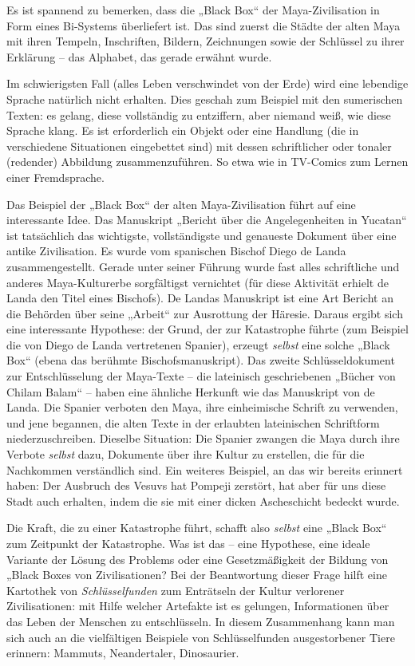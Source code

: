 \documentclass[11pt,a4paper]{article}
\begin{document}
Es ist spannend zu bemerken, dass die „Black Box“ der Maya-Zivilisation in
Form eines Bi-Systems überliefert ist.  Das sind zuerst die Städte der alten
Maya mit ihren Tempeln, Inschriften, Bildern, Zeichnungen sowie der Schlüssel
zu ihrer Erklärung -- das Alphabet, das gerade erwähnt wurde.

Im schwierigsten Fall (alles Leben verschwindet von der Erde) wird eine
lebendige Sprache natürlich nicht erhalten. Dies geschah zum Beispiel mit den
sumerischen Texten: es gelang, diese vollständig zu entziffern, aber niemand
weiß, wie diese Sprache klang. Es ist erforderlich ein Objekt oder eine
Handlung (die in verschiedene Situationen eingebettet sind) mit dessen
schriftlicher oder tonaler (redender) Abbildung zusammenzuführen. So etwa wie
in TV-Comics zum Lernen einer Fremdsprache.

Das Beispiel der „Black Box“ der alten Maya-Zivilisation führt auf eine
interessante Idee. Das Manuskript „Bericht über die Angelegenheiten in
Yucatan“ ist tatsächlich das wichtigste, vollständigste und genaueste Dokument
über eine antike Zivilisation. Es wurde vom spanischen Bischof Diego de Landa
zusammengestellt. Gerade unter seiner Führung wurde fast alles schriftliche
und anderes Maya-Kulturerbe sorgfältigst vernichtet (für diese Aktivität
erhielt de Landa den Titel eines Bischofs). De Landas Manuskript ist eine Art
Bericht an die Behörden über seine „Arbeit“ zur Ausrottung der Häresie. Daraus
ergibt sich eine interessante Hypothese: der Grund, der zur Katastrophe führte
(zum Beispiel die von Diego de Landa vertretenen Spanier), erzeugt
\emph{selbst} eine solche „Black Box“ (ebena das berühmte Bischofsmanuskript).
Das zweite Schlüsseldokument zur Entschlüsselung der Maya-Texte -- die
lateinisch geschriebenen „Bücher von Chilam Balam“ -- haben eine ähnliche
Herkunft wie das Manuskript von de Landa. Die Spanier verboten den Maya, ihre
einheimische Schrift zu verwenden, und jene begannen, die alten Texte in der
erlaubten lateinischen Schriftform niederzuschreiben. Dieselbe Situation: Die
Spanier zwangen die Maya durch ihre Verbote \emph{selbst} dazu, Dokumente über
ihre Kultur zu erstellen, die für die Nachkommen verständlich sind. Ein
weiteres Beispiel, an das wir bereits erinnert haben: Der Ausbruch des Vesuvs
hat Pompeji zerstört, hat aber für uns diese Stadt auch erhalten, indem die
sie mit einer dicken Ascheschicht bedeckt wurde.

Die Kraft, die zu einer Katastrophe führt, schafft also \emph{selbst} eine
„Black Box“ zum Zeitpunkt der Katastrophe. Was ist das -- eine Hypothese, eine
ideale Variante der Lösung des Problems oder eine Gesetzmäßigkeit der Bildung
von „Black Boxes von Zivilisationen? Bei der Beantwortung dieser Frage hilft
eine Kartothek von \emph{Schlüsselfunden} zum Enträtseln der Kultur verlorener
Zivilisationen: mit Hilfe welcher Artefakte ist es gelungen, Informationen
über das Leben der Menschen zu entschlüsseln. In diesem Zusammenhang kann man
sich auch an die vielfältigen Beispiele von Schlüsselfunden ausgestorbener
Tiere erinnern: Mammuts, Neandertaler, Dinosaurier.
\end{document}
